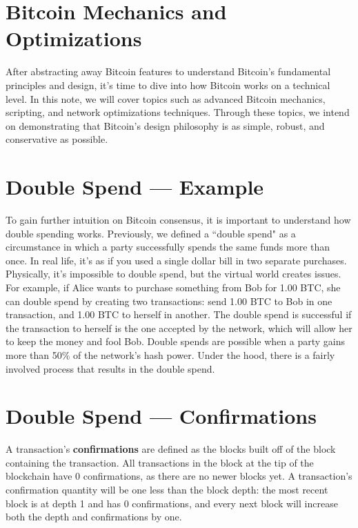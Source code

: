 \documentclass[full.tex]{subfiles}
\begin{document}
    \thispagestyle{firstpage}
    \vspace*{2\baselineskip}
    
    
    \section*{Bitcoin Mechanics and Optimizations}
    
    After abstracting away Bitcoin features to understand Bitcoin's fundamental principles and design, it's time to dive into how Bitcoin works on a technical level. In this note, we will cover topics such as advanced Bitcoin mechanics, scripting, and network optimizations techniques. Through these topics, we intend on demonstrating that Bitcoin's design philosophy is as simple, robust, and conservative as possible.
    
     \section*{Double Spend --- Example}
 
     To gain further intuition on Bitcoin consensus, it is important to understand how double spending works. Previously, we defined a ``double spend" as a circumstance in which a party successfully spends the same funds more than once. In real life, it's as if you used a single dollar bill in two separate purchases. Physically, it's impossible to double spend, but the virtual world creates issues. For example, if Alice wants to purchase something from Bob for 1.00 BTC, she can double spend by creating two transactions: send 1.00 BTC to Bob in one transaction, and 1.00 BTC to herself in another. The double spend is successful if the transaction to herself is the one accepted by the network, which will allow her to keep the money and fool Bob. Double spends are possible when a party gains more than 50\% of the network's hash power. Under the hood, there is a fairly involved process that results in the double spend.
     
     \section*{Double Spend --- Confirmations}
     
     A transaction's \textbf{confirmations} are defined as the blocks built off of the block containing the transaction. All transactions in the block at the tip of the blockchain have 0 confirmations, as there are no newer blocks yet. A transaction's confirmation quantity will be one less than the block depth: the most recent block is at depth 1 and has 0 confirmations, and every next block will increase both the depth and confirmations by one.
 
\end{document}
